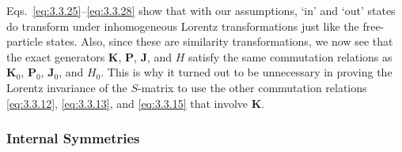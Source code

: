 Eqs.~\eqref{eq:3.3.25}--\eqref{eq:3.3.28} show that with our assumptions, `in' and `out' states do
transform under inhomogeneous Lorentz transformations just like the free-particle
states. Also, since these are similarity transformations, we now see that the exact
generators $\mathbf{K}$, $\mathbf{P}$, $\mathbf{J}$, and $H$ satisfy the same
commutation relations as $\mathbf{K}_0$, $\mathbf{P}_0$, $\mathbf{J}_0$, and $H_0$.
This is why it turned out to be unnecessary in proving the Lorentz invariance of
the $S$-matrix to use the other commutation relations \eqref{eq:3.3.12}, \eqref{eq:3.3.13}, and
\eqref{eq:3.3.15} that involve $\mathbf{K}$.

\subsubsection*{Internal Symmetries}

